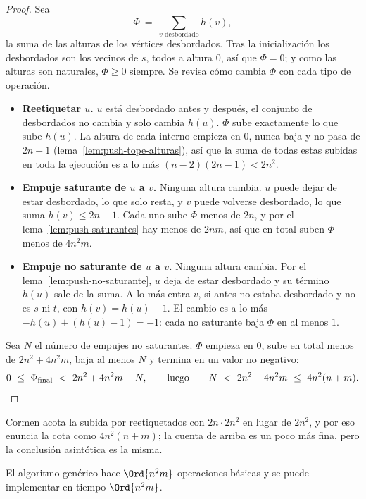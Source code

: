\documentclass[11pt,letterpaper]{article}
\begin{document}
\begin{proof}
  Sea
  \[
    \Phi \ =\ \sum_{v \text{ desbordado}} h(v) ,
  \]
  la suma de las alturas de los vértices desbordados. Tras la
  inicialización los desbordados son los vecinos de $s$, todos a altura
  $0$, así que $\Phi = 0$; y como las alturas son naturales,
  $\Phi \ge 0$ siempre. Se revisa cómo cambia $\Phi$ con cada tipo de
  operación.
  \begin{itemize}
    \item \textbf{Reetiquetar $u$.} $u$ está desbordado antes y después,
          el conjunto de desbordados no cambia y solo cambia $h(u)$.
          $\Phi$ sube exactamente lo que sube $h(u)$. La altura de cada
          interno empieza en $0$, nunca baja y no pasa de $2n - 1$
          (lema~\ref{lem:push-tope-alturas}), así que la suma de todas
          estas subidas en toda la ejecución es a lo más
          $(n - 2)(2n - 1) < 2n^2$.
    \item \textbf{Empuje saturante de $u$ a $v$.} Ninguna altura cambia.
          $u$ puede dejar de estar desbordado, lo que solo resta, y $v$
          puede volverse desbordado, lo que suma
          $h(v) \le 2n - 1$. Cada uno sube $\Phi$ menos de $2n$, y por
          el lema~\ref{lem:push-saturantes} hay menos de $2nm$, así que
          en total suben $\Phi$ menos de $4n^2 m$.
    \item \textbf{Empuje no saturante de $u$ a $v$.} Ninguna altura
          cambia. Por el lema~\ref{lem:push-no-saturante}, $u$ deja de
          estar desbordado y su término $h(u)$ sale de la suma. A lo
          más entra $v$, si antes no estaba desbordado y no es $s$ ni
          $t$, con $h(v) = h(u) - 1$. El cambio es a lo más
          $-h(u) + (h(u) - 1) = -1$: cada no saturante baja $\Phi$ en
          al menos $1$.
  \end{itemize}
  Sea $N$ el número de empujes no saturantes. $\Phi$ empieza en $0$,
  sube en total menos de $2n^2 + 4n^2 m$, baja al menos $N$ y termina
  en un valor no negativo:
  \[
    0 \ \le\ \Phi_{\text{final}} \ <\ 2n^2 + 4n^2 m - N ,
    \qquad\text{luego}\qquad
    N \ <\ 2n^2 + 4n^2 m \ \le\ 4n^2(n + m) . \qedhere
  \]
\end{proof}

Cormen acota la subida por reetiquetados con $2n \cdot 2n^2$ en lugar
de $2n^2$, y por eso enuncia la cota como $4n^2(n + m)$; la cuenta de
arriba es un poco más fina, pero la conclusión asintótica es la misma.

\begin{teorema}
  \label{teo:push-costo}
  El algoritmo genérico hace $\Ord{n^2 m}$ operaciones básicas y se
  puede implementar en tiempo $\Ord{n^2 m}$.
\end{teorema}
\end{document}
